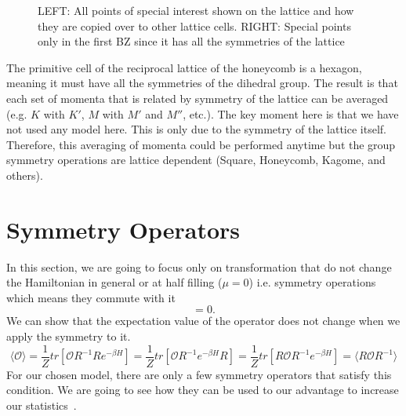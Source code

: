\begin{figure}
\begin{center}
  \caption{LEFT: All points of special interest shown on the lattice and how they are copied over to other lattice cells. RIGHT: Special points only in the first BZ since it has all the symmetries of the lattice}
  \label{fig:points}
\end{center}
\end{figure}
The primitive cell of the reciprocal lattice of the honeycomb is a hexagon, meaning it must have all the symmetries of the dihedral group. The result is that each set of momenta that is related by symmetry of the lattice can be averaged (e.g. $K$ with $K'$, $M$ with $M'$ and $M''$, etc.). The key moment here is that we have not used any model here. This is only due to the symmetry of the lattice itself. Therefore, this averaging of momenta could be performed anytime but the group symmetry operations are lattice dependent (Square, Honeycomb, Kagome, and others).

\section{Symmetry Operators}
\label{sec:sym-oper}
In this section, we are going to focus only on transformation that do not change the Hamiltonian in general or at half filling ($\mu=0$) i.e. symmetry operations which means they commute with it 
\begin{equation}
  [H,R] = 0.
\end{equation}
We can show that the expectation value of the operator does not change when we apply the symmetry to it.
\begin{equation}
 \langle \mathcal{O} \rangle = \frac{1}{Z} tr[\mathcal{O}R^{-1}Re^{-\beta H}] = \frac{1}{Z} tr[\mathcal{O}R^{-1}e^{-\beta H}R] = \frac{1}{Z} tr[R\mathcal{O}R^{-1}e^{-\beta H}] = \langle R\mathcal{O}R^{-1} \rangle
\end{equation}
For our chosen model, there are only a few symmetry operators that satisfy this condition. We are going to see how they can be used to our advantage to increase our statistics~\cite{evan}.

